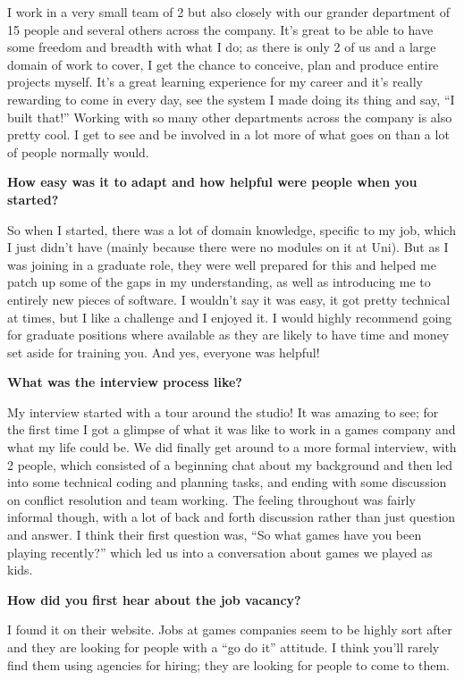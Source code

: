 \documentclass{scrartcl}
\begin{document}
\begin{appendices}
\par
I work in a very small team of 2 but also closely with our grander department of 15 people and several others across the company. It’s great to be able to have some freedom and breadth with what I do; as there is only 2 of us and a large domain of work to cover, I get the chance to conceive, plan and produce entire projects myself. It’s a great learning experience for my career and it’s really rewarding to come in every day, see the system I made doing its thing and say, “I built that!”
Working with so many other departments across the company is also pretty cool. I get to see and be involved in a lot more of what goes on than a lot of people normally would. 
\par
\textbf{How easy was it to adapt and how helpful were people when you started?}
\par
So when I started, there was a lot of domain knowledge, specific to my job, which I just didn’t have (mainly because there were no modules on it at Uni). But as I was joining in a graduate role, they were well prepared for this and helped me patch up some of the gaps in my understanding, as well as introducing me to entirely new pieces of software. I wouldn’t say it was easy, it got pretty technical at times, but I like a challenge and I enjoyed it. I would highly recommend going for graduate positions where available as they are likely to have time and money set aside for training you. 
And yes, everyone was helpful!
\par
\textbf{What was the interview process like?}
\par
My interview started with a tour around the studio! It was amazing to see; for the first time I got a glimpse of what it was like to work in a games company and what my life could be. We did finally get around to a more formal interview, with 2 people, which consisted of a beginning chat about my background and then led into some technical coding and planning tasks, and ending with some discussion on conflict resolution and team working. 
The feeling throughout was fairly informal though, with a lot of back and forth discussion rather than just question and answer. I think their first question was, “So what games have you been playing recently?” which led us into a conversation about games we played as kids.
\par
\textbf{How did you first hear about the job vacancy?}
\par
I found it on their website. Jobs at games companies seem to be highly sort after and they are looking for people with a “go do it” attitude. I think you’ll rarely find them using agencies for hiring; they are looking for people to come to them.

\end{appendices}
\end{document}
